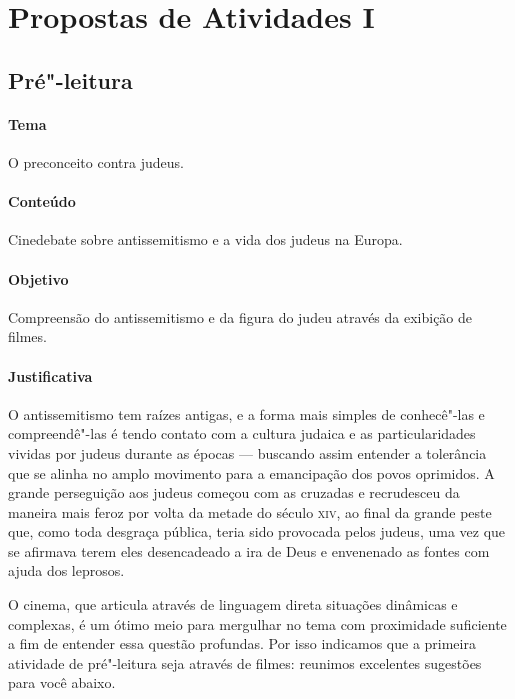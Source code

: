 \documentclass[12pt]{extarticle}
\begin{document}


\section{Propostas de Atividades I}

\subsection{Pré"-leitura}

\paragraph{Tema} O preconceito contra judeus.

\paragraph{Conteúdo} Cinedebate sobre antissemitismo e a vida 
dos judeus na Europa.

\paragraph{Objetivo} Compreensão do antissemitismo e da figura do judeu 
através da exibição de filmes.

\paragraph{Justificativa} O antissemitismo tem raízes antigas, e a forma 
mais simples de conhecê"-las e compreendê"-las é tendo contato com a 
cultura judaica e as particularidades vividas por judeus durante as 
épocas --- buscando assim entender a tolerância que se alinha no amplo 
movimento para a emancipação dos povos oprimidos. A grande perseguição 
aos judeus começou com as cruzadas e recrudesceu da maneira mais feroz 
por volta da metade do século \textsc{xiv}, ao final da grande peste 
que, como toda desgraça pública, teria sido provocada pelos judeus, 
uma vez que se afirmava terem eles desencadeado a ira de Deus e 
envenenado as fontes com ajuda dos leprosos.

O cinema, que articula através de linguagem direta
situações dinâmicas e complexas, é um ótimo 
meio para mergulhar no tema com proximidade suficiente a fim de 
entender essa questão profundas. Por isso indicamos que a primeira 
atividade de pré"-leitura seja através de filmes: reunimos 
excelentes sugestões para você abaixo.
\end{document}
